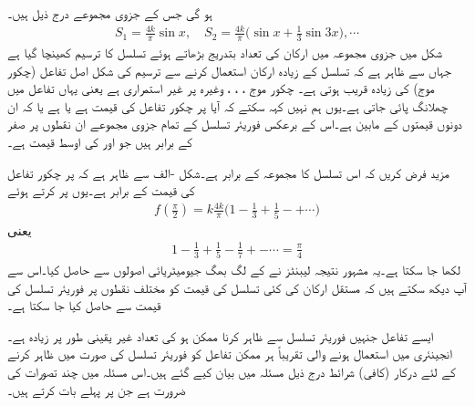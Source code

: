 ہو گی جس کے جزوی مجموعے درج ذیل ہیں۔
\begin{align*}
S_1=\frac{4k}{\pi}\sin x,\quad S_2=\frac{4k}{\pi}\big(\sin x+\frac{1}{3}\sin 3x\big),\cdots
\end{align*}
شکل  میں جزوی مجموعہ میں ارکان کی تعداد بتدریج بڑھاتے ہوئے تسلسل کا ترسیم کھینچا  گیا ہے جہاں سے ظاہر ہے کہ تسلسل کے زیادہ ارکان استعمال کرنے سے  ترسیم کی شکل اصل تفاعل (چکور موج) کی زیادہ  قریب ہوتی ہے۔ چکور موج ، ، ، وغیرہ پر غیر استمراری ہے یعنی یہاں تفاعل میں چھلانگ پائی جاتی ہے۔یوں ہم نہیں کہہ سکتے کہ آیا  پر چکور تفاعل کی قیمت  ہے یا  ہے  یا کہ ان دونوں قیمتوں کے مابین ہے۔اس کے برعکس فوریئر تسلسل کے تمام جزوی مجموعے ان نقطوں پر صفر کے برابر ہیں جو  اور  کی اوسط قیمت ہے۔

مزید فرض کریں کہ اس تسلسل کا مجموعہ  کے برابر ہے۔شکل -الف سے ظاہر ہے کہ  پر چکور تفاعل کی قیمت  کے برابر ہے۔یوں  پر  کرتے ہوئے
\begin{align*}
f(\frac{\pi}{2})=k\frac{4k}{\pi}\big(1-\frac{1}{3}+\frac{1}{5}-+\cdots\big )
\end{align*}
یعنی
\begin{align}\label{مساوات_فوریئر_لیبنٹز_تعلق}
1-\frac{1}{3}+\frac{1}{5}-\frac{1}{7}+-\cdots=\frac{\pi}{4}
\end{align}
لکھا جا سکتا ہے۔یہ مشہور نتیجہ لیبنٹز نے  کے لگ بھگ جیومیٹریائی اصولوں سے حاصل کیا۔اس سے آپ دیکھ سکتے ہیں کہ مستقل ارکان کی کئی تسلسل کی قیمت کو  مختلف نقطوں پر فوریئر تسلسل کی قیمت سے حاصل کیا جا سکتا ہے۔  

ایسے تفاعل جنہیں فوریئر تسلسل سے  ظاہر کرنا ممکن ہو کی تعداد غیر یقینی طور پر زیادہ ہے۔ انجینئری میں استعمال ہونے  والی تقریباً ہر ممکن تفاعل کو فوریئر تسلسل کی صورت میں ظاہر کرنے کے لئے درکار (کافی) شرائط درج ذیل مسئلہ  میں بیان کیے گئے ہیں۔اس مسئلہ میں چند تصورات کی ضرورت ہے جن پر پہلے بات کرتے ہیں۔

